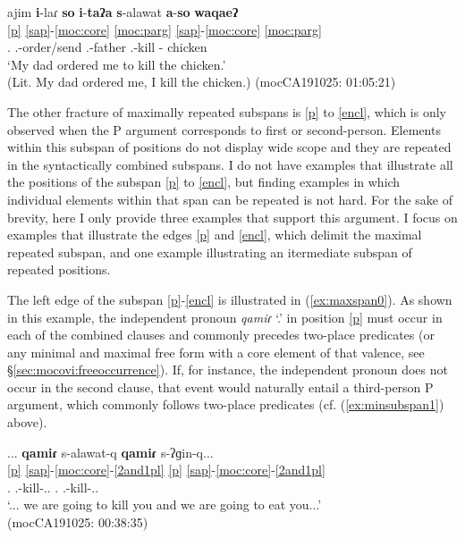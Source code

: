 \documentclass[output=paper]{langscibook}
\begin{document}
\ea \label{ex:minsubspan1}
	\glll ajim \textbf{i}-laɾ \textbf{so} \textbf{i}-\textbf{taʔa} \textbf{s}-alawat \textbf{a}-\textbf{so} \textbf{waqaeʔ} \\
	       \ref{p}   \ref{sap}-\ref{moc:core} \ref{moc:parg} {} \ref{sap}-\ref{moc:core} \ref{moc:parg}\\
	    {\Fsg.\Pron} {\Third.\II}-order/send {\DetTwo} {\First\Sg.\Poss}-father {\First.\II}-kill  {\F}-{\DetTwo} chicken   \\
	\glt `My dad ordered me to kill the chicken.' \\
	\glt  (Lit. My dad ordered me, I kill the chicken.) \hfill(mocCA191025: 01:05:21)
\z

The other fracture of maximally repeated subspans is \ref{p} to \ref{encl}, which is only observed when the P argument corresponds to first or second-person. Elements within this subspan of positions do not display wide scope and they are repeated in the syntactically combined subspans.  I do not have examples that illustrate all the positions of the subspan \ref{p} to \ref{encl}, but finding  examples in which individual elements within that span can be repeated is not hard. For the sake of brevity, here I only provide three examples that support this argument. I focus on examples that illustrate the edges \ref{p} and \ref{encl}, which delimit the maximal repeated subspan, and one example illustrating an itermediate subspan of repeated positions. 

The left edge of the subspan \ref{p}-\ref{encl} is illustrated in (\ref{ex:maxspan0}). As shown in this example, the independent pronoun \textit{qamiɾ} `\Second\Sg.\Pron' in position \ref{p} must occur in each of the combined clauses and commonly precedes two-place predicates (or any minimal and maximal free form with a core element of that valence, see \S\ref{sec:mocovi:freeoccurrence}). If, for instance, the independent pronoun does not occur in the second clause, that event would naturally entail a third-person P argument, which commonly follows two-place predicates (cf. (\ref{ex:minsubspan1}) above). 

\ea\label{ex:maxspan0}
\glll ... \textbf{qamiɾ} s-alawat-q \textbf{qamiɾ} s-ʔɡin-q...\\
{} \ref{p} \ref{sap}-\ref{moc:core}-\ref{2and1pl} \ref{p} \ref{sap}-\ref{moc:core}-\ref{2and1pl}\\
{} {\Second\Sg.\Pron} {\First.\II}-kill-{\First.\II.\Pl} {\Second\Sg.\Pron} {\First.\II}-kill-{\First.\II.\Pl} \\
\glt `... we are going to kill you and we are going to eat you...'\\
\glt \hfill (mocCA191025: 00:38:35)
\z
\end{document}
